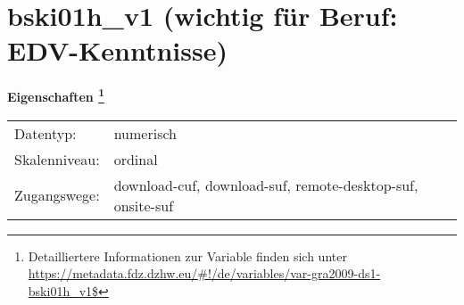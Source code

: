 
    \setcounter{footnote}{0}

    \vspace*{-1.8cm}
	\section{bski01h\_v1 (wichtig für Beruf: EDV-Kenntnisse)}
	\label{section:bski01h_v1}



    \vspace*{0.5cm}
    \noindent\textbf{Eigenschaften
	\footnote{Detailliertere Informationen zur Variable finden sich unter
		\url{https://metadata.fdz.dzhw.eu/\#!/de/variables/var-gra2009-ds1-bski01h_v1$}}}\\
	\begin{tabularx}{\hsize}{@{}lX}
	Datentyp: & numerisch \\
	Skalenniveau: & ordinal \\
	Zugangswege: &
	  download-cuf, 
	  download-suf, 
	  remote-desktop-suf, 
	  onsite-suf
 \\
    \end{tabularx}



